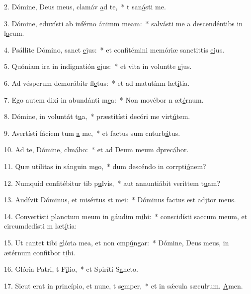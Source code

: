 2. Dómine, Deus meus, clamáv \uline{a}d te,~* t san\uline{á}sti me.\par 
3. Dómine, eduxísti ab inférno ánimm m\uline{e}am:~* salvásti me a descendéntibs in l\uline{a}cum.\par 
4. Psállite Dómino, sanct \uline{e}jus:~* et confitémini memóriæ sanctittis \uline{e}jus.\par 
5. Quóniam ira in indignatión \uline{e}jus:~* et vita in voluntte \uline{e}jus.\par 
6. Ad vésperum demorábitr fl\uline{e}tus:~* et ad matutínm læt\uline{í}tia.\par 
7. Ego autem dixi in abundánti m\uline{e}a:~* Non movébor n æt\uline{é}rnum.\par 
8. Dómine, in voluntát t\uline{u}a,~* præstitísti decóri me virt\uline{ú}tem.\par 
9. Avertísti fáciem tum \uline{a} me,~* et factus sum cnturb\uline{á}tus.\par 
10. Ad te, Dómine, clm\uline{á}bo:~* et ad Deum meum dprec\uline{á}bor.\par 
11. Quæ utílitas in sánguin m\uline{e}o,~* dum descéndo in corrpti\uline{ó}nem?\par 
12. Numquid confitébitur tib p\uline{u}lvis,~* aut annuntiábit verittem t\uline{u}am?\par 
13. Audívit Dóminus, et misértus st m\uline{e}i:~* Dóminus factus est adjtor m\uline{e}us.\par 
14. Convertísti planctum meum in gáudim m\uline{i}hi:~* conscidísti saccum meum, et circumdedísti m læt\uline{í}tia:\par 
15. Ut cantet tibi glória mea, et non cmp\uline{ú}ngar:~* Dómine, Deus meus, in ætérnum confitbor t\uline{i}bi.\par 
16. Glória Patri, t F\uline{í}lio,~* et Spiríti S\uline{a}ncto.\par 
17. Sicut erat in princípio, et nunc, t s\uline{e}mper,~* et in sǽcula sæculrum. \uline{A}men.\par 
